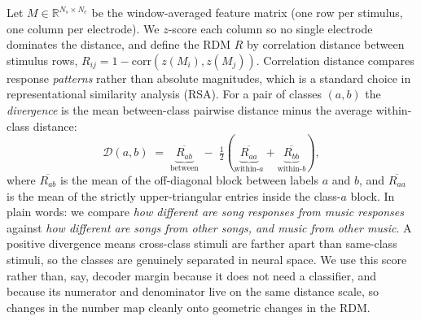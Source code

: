\documentclass[11pt]{article}
\newcommand{\divg}{\mathcal{D}}
\begin{document}
Let $M \in \mathbb{R}^{N_s \times N_e}$ be the window-averaged feature matrix (one row per stimulus, one column per electrode). We $z$-score each column so no single electrode dominates the distance, and define the RDM $R$ by correlation distance between stimulus rows, $R_{ij} = 1 - \mathrm{corr}(z(M_i), z(M_j))$. Correlation distance compares response \emph{patterns} rather than absolute magnitudes, which is a standard choice in representational similarity analysis (RSA). For a pair of classes $(a, b)$ the \emph{divergence} is the mean between-class pairwise distance minus the average within-class distance:
\begin{equation}
  \divg(a, b) \;=\; \underbrace{\overline{R_{ab}}}_{\text{between}} \;-\; \tfrac{1}{2}\!\left(\underbrace{\overline{R_{aa}}}_{\text{within-}a} + \underbrace{\overline{R_{bb}}}_{\text{within-}b}\right),
\label{eq:divergence}
\end{equation}
where $\overline{R_{ab}}$ is the mean of the off-diagonal block between labels $a$ and $b$, and $\overline{R_{aa}}$ is the mean of the strictly upper-triangular entries inside the class-$a$ block. In plain words: we compare \emph{how different are song responses from music responses} against \emph{how different are songs from other songs, and music from other music}. A positive divergence means cross-class stimuli are farther apart than same-class stimuli, so the classes are genuinely separated in neural space. We use this score rather than, say, decoder margin because it does not need a classifier, and because its numerator and denominator live on the same distance scale, so changes in the number map cleanly onto geometric changes in the RDM.
\end{document}
